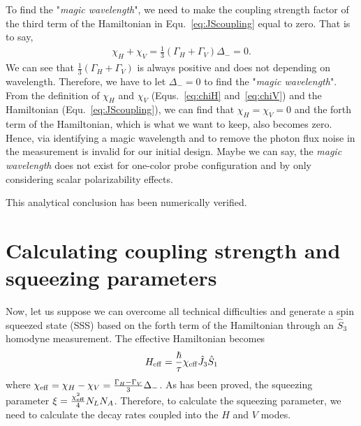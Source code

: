 To find the "\textit{magic wavelength}", we need to make the coupling strength factor of the third term of the Hamiltonian in Equ.~\eqref{eq:JScoupling} equal to zero. That is to say,
\begin{align}
\chi_H+\chi_V=\frac{1}{3}\left(\Gamma_H + \Gamma_V \right)\Delta_- = 0.
\end{align}
We can see that $ \frac{1}{3}\left(\Gamma_H + \Gamma_V \right) $ is always positive and does not 
depending on wavelength. Therefore, we have to let $ \Delta_-=0 $ to find the "\textit{magic 
wavelength}". From the definition of $ \chi_H $ and $ \chi_V $ 
(Equs.~\eqref{eq:chiH} and~\eqref{eq:chiV}) and the Hamiltonian (Equ.~\eqref{eq:JScoupling}), we can 
find that $ \chi_H=\chi_V=0 $ and the forth term of the Hamiltonian, which is what we want to keep, also 
becomes zero. Hence, via identifying a magic wavelength and to remove the photon flux noise in the 
measurement is invalid for our initial design. Maybe we can say, the \textit{magic wavelength} does not 
exist for one-color probe configuration and by only considering scalar polarizability effects. 

This analytical conclusion has been numerically verified. 

\section{Calculating coupling strength and squeezing parameters}
Now, let us suppose we can overcome all technical difficulties and generate a spin squeezed state (SSS) based on the forth term of the Hamiltonian through an $ \hat{S}_3 $ homodyne measurement. The effective Hamiltonian becomes
\begin{align}
	H_{\rm eff} = \frac{\hbar}{\tau} \chi_{\rm eff} \hat{J}_3 \hat{S}_1
\end{align}
where $\chi_{\rm eff} = \chi_{H} - \chi_{V}=\frac{\Gamma_H-\Gamma_V}{3}\Delta_-$. As has been proved, the squeezing parameter $ \xi =\frac{\chi_{\rm eff}^2 }{4}N_LN_A $. Therefore, to calculate the squeezing parameter, we need to calculate the decay rates coupled into the $ H $ and $ V $ modes. 

